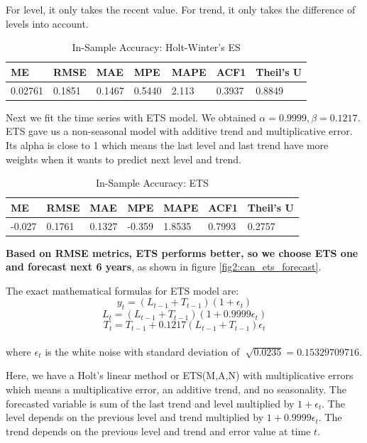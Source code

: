 \documentclass[journal, a4paper]{IEEEtran}
\begin{document}
For level, it only takes the recent value. For trend, it only takes the difference of levels into account.
 \begin{table}[H]
 \caption{In-Sample Accuracy: Holt-Winter's ES}
 \label{table:accuracy_in}
\centering
 \begin{tabular}{|p{0.75cm}|p{0.75cm}|p{0.75cm}|p{0.75cm}|p{0.75cm}|p{0.75cm}|p{1.2cm}|}
 \hline
 ME     &  RMSE      &  MAE      &   MPE    &   MAPE   &      ACF1  & Theil's U  \\ \hline
 0.02761  & 0.1851  & 0.1467  & 0.5440  & 2.113 & 0.3937  & 0.8849       \\
 \hline
 \end{tabular}
 \end{table}
Next we fit the time series with ETS model. We obtained $\alpha=0.9999, \beta=0.1217$.
 ETS gave us a non-seasonal model with additive trend and multiplicative error. Its alpha is close to 1 which means the last level and last trend have more weights when it wants to predict next level and trend. 
  \begin{table}[H]
 \caption{In-Sample Accuracy: ETS}
 \label{table:accuracy_in_ets}
\centering
 \begin{tabular}{|p{0.75cm}|p{0.75cm}|p{0.75cm}|p{0.75cm}|p{0.75cm}|p{0.75cm}|p{1.2cm}|}
 \hline
 ME     &  RMSE      &  MAE      &   MPE    &   MAPE   &      ACF1  & Theil's U  \\ \hline
 -0.027  & 0.1761  & 0.1327  & -0.359  & 1.8535 & 0.7993  & 0.2757      \\
 \hline
 \end{tabular}
 \end{table}
 \textbf{Based on RMSE metrics, ETS performs better, so we choose ETS one and forecast next 6 years}, as shown in figure \ref{fig2:can_ets_forecast}.
 
The exact mathematical formulas for ETS model are:
 $$y_{t}=(L_{t-1}+T_{t-1})(1+\epsilon_{t})$$
$$L_{t}=(L_{t-1}+T_{t-1})(1+0.9999\epsilon_{t})$$
$$T_t=T_{t-1}+0.1217(L_{t-1}+T_{t-1})\epsilon_{t}$$
\\

 where $\epsilon_{t}$ is the white noise with standard deviation of $\sqrt[]{0.0235}=0.15329709716$.

Here, we have a Holt’s linear method or ETS(M,A,N) with multiplicative errors which means a multiplicative error, an additive trend, and no seasonality. The forecasted variable is sum of the last trend and level multiplied by $1+\epsilon_{t}$. The level depends on the previous level and trend multiplied by $1+0.9999\epsilon_{t}$. The trend depends on the previous level and trend and error value at time $t$.
 
\end{document}
